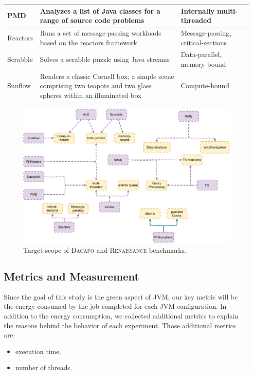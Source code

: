 \begin{table}
{\begin{tabular}{|p{0.1\linewidth}|p{0.6\linewidth}|p{0.3\linewidth}|}
            \hline
            \textsf{PMD}          & Analyzes a list of Java classes for a range of source code problems                                                  & Internally multi-threaded                  \\
            \hline
            \textsf{Reactors}     & Runs a set of message-passing workloads based on the reactors framework                                              & Message-passing, critical-sections         \\
            \hline
            \textsf{Scrabble}     & Solves a scrabble puzzle using Java streams                                                                          & Data-parallel, memory-bound                \\
            \hline
            \textsf{Sunflow}      & Renders a classic Cornell box; a simple scene comprising two teapots and two glass spheres within an illuminated box & Compute-bound                              \\
            \hline
        \end{tabular}
    }
\end{table}


\begin{figure}%
    \centering
    \includegraphics[width=\linewidth]{imgs/jvm_benchmarks}
    \caption{Target scope of \textsc{Dacapo} and \textsc{Renaissance} benchmarks.}
    \label{fig:jvm-benchmarks-classification}
\end{figure}

\subsection{Metrics and Measurement}
Since the goal of this study is the green aspect of JVM, our key metric will be the energy consumed by the job completed for each JVM configuration.
In addition to the energy consumption, we collected additional metrics to explain the reasons behind the behavior of each experiment.
Those additional metrics are:
\begin{itemize}
    \item execution time,
    \item number of threads.
\end{itemize}

